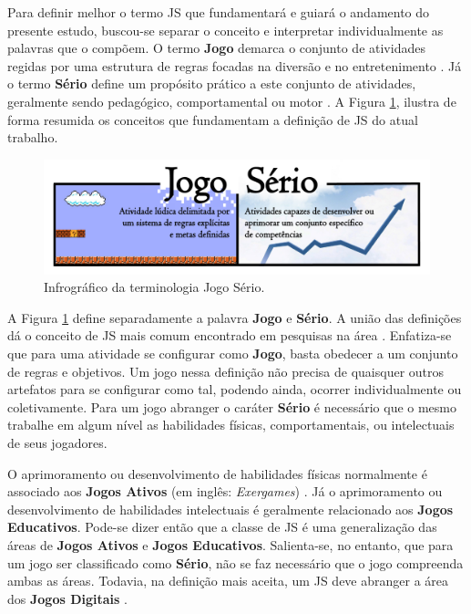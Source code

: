 Para definir melhor o termo \ac{JS} que fundamentará e guiará o andamento do presente estudo, buscou-se separar o conceito e interpretar individualmente as palavras que o compõem. O termo \textbf{Jogo} demarca o conjunto de atividades regidas por uma estrutura de regras focadas na diversão e no entretenimento \cite{kishimoto1994jogo}. Já o termo \textbf{Sério} define um propósito prático a este conjunto de atividades, geralmente sendo pedagógico, comportamental ou motor \cite{schroeder2017wobu, baptista2017jogos}. %
A Figura \ref{fig:JS}, ilustra de forma resumida os conceitos que fundamentam a definição de \ac{JS} do atual trabalho. 

\pagebreak

\begin{figure}[htb]

	\caption{\label{fig:JS}Infrográfico da terminologia Jogo Sério.}\vspace{-0.1cm}
  \hspace{-0.9cm}
  \includegraphics[width=1.1\linewidth]{./Visuais/JogoSerio.pdf}\vspace{-0.1cm}

\end{figure}

A Figura \ref{fig:JS} define separadamente a palavra \textbf{Jogo} e \textbf{Sério}. A união das definições dá o conceito de \ac{JS} mais comum encontrado em pesquisas na área \cite{michael2005serious}. Enfatiza-se que para uma atividade se configurar como \textbf{Jogo}, basta obedecer a um conjunto de regras e objetivos. Um jogo nessa definição não precisa de quaisquer outros artefatos para se configurar como tal, podendo ainda, ocorrer individualmente ou coletivamente. Para um jogo abranger o caráter \textbf{Sério} é necessário que o mesmo trabalhe em algum nível as habilidades físicas, comportamentais, ou intelectuais de seus jogadores. 

O aprimoramento ou desenvolvimento de habilidades físicas normalmente é associado aos \textbf{Jogos Ativos} (em inglês: \textit{Exergames}) \cite{araujo2017exergames, schroeder2017wobu}. Já o aprimoramento ou desenvolvimento de habilidades intelectuais é geralmente relacionado aos \textbf{Jogos Educativos}. Pode-se dizer então que a classe de \ac{JS} é uma generalização das áreas de \textbf{Jogos Ativos} e \textbf{Jogos Educativos}. Salienta-se, no entanto, que para um jogo ser classificado como \textbf{Sério}, não se faz necessário que o jogo compreenda ambas as áreas. Todavia, na definição mais aceita, um \ac{JS} deve abranger a área dos \textbf{Jogos Digitais} \cite{laamarti2014overview}.

